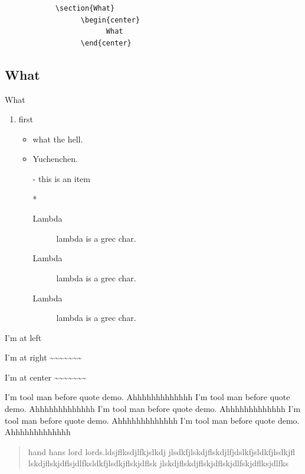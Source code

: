 \documentclass{ctexart}
\begin{document}
      \begin{verbatim}
            \section{What}
                  \begin{center}
                        What
                  \end{center}
      \end{verbatim}
      \begin{verbatim*}
            \section{What}
                  \begin{center}
                        What
                  \end{center}
      \end{verbatim*}
      \begin{enumerate}
            \item first
            \begin{itemize}
                  \item what the hell.
                  \item Yuchenchen.
                  \item[-] this is an item
                  \item[*] 
                  \begin{description}
                        \item[Lambda] lambda is a grec char. 
                        \item[Lambda] lambda is a grec char. 
                        \item[Lambda] lambda is a grec char. 
                  \end{description}
            \end{itemize}
      \end{enumerate}
      
      \begin{flushleft}
           I'm at left~~~~~~~~~~~~~~~~ 
      \end{flushleft}
      \begin{flushright}
           I'm at right \~{}\~{}\~{}\~{}\~{}\~{}\~{}
      \end{flushright}
      \begin{center}
           I'm at center \~{}\~{}\~{}\~{}\~{}\~{}\~{}
      \end{center}
      I'm tool man before quote demo. Ahhhhhhhhhhhhh
      I'm tool man before quote demo. Ahhhhhhhhhhhhh
      I'm tool man before quote demo. Ahhhhhhhhhhhhh
      I'm tool man before quote demo. Ahhhhhhhhhhhhh
      I'm tool man before quote demo. Ahhhhhhhhhhhhh
      \begin{quotation}
            hand hans lord lords.ldsjflksdjlfkjslkdj
            jlsdkfjlskdjflskdjlfjdslkfjsldkfjlsdkjfl
            lskdjflskjdflsjdlfksldkfjlsdkjflskjdflsk
            jlskdjflskdjflskjdflskjdlfskjdflksjdlfks
      \end{quotation}
\end{document}
